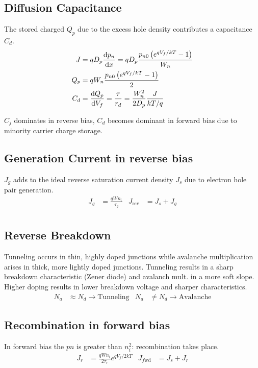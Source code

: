 \documentclass[a4paper, fontsize=8pt, landscape, DIV=1]{scrartcl}
\begin{document}
\begin{multicols*}{4}
    \subsection{Diffusion Capacitance}
    The stored charged $Q_p$ due to the excess hole density contributes a capacitance $C_d$.
    \begin{align*}
      J &= qD_p\frac{\mathrm{d}p_n}{\mathrm{d}x} = qD_p\frac{p_{n0}\left(e^{qV_f/kT}-1\right)}{W_n} \\
      Q_p &= qW_n\frac{p_{n0}\left(e^{qV_f/kT}-1\right)}{2} \\
      C_d &= \frac{\mathrm{d}Q_p}{\mathrm{d}V_f} = \frac{\tau}{r_d} = \frac{W_n^2}{2D_p}\frac{J}{kT/q}
    \end{align*}

    $C_j$ dominates in reverse bias, $C_d$ becomes dominant in forward bias due to minority carrier charge storage.


    \subsection{Generation Current in reverse bias}
    $J_g$ adds to the ideal reverse saturation current density $J_s$ due to electron hole pair generation.
    \begin{align*}
      J_g &= \frac{qWn_i}{\tau_g} & J_{\text{rev}} &= J_s + J_g\\
    \end{align*}

    \subsection{Reverse Breakdown}
    Tunneling occurs in thin, highly doped junctions while avalanche multiplication arises in thick, more lightly doped junctions.
    Tunneling results in a sharp breakdown characteristic (Zener diode) and avalanch mult. in a more soft slope.
    Higher doping results in lower breakdown voltage and sharper characteristics.
    \begin{align*}
      N_a &\approx N_d \to \text{Tunneling} & N_a &\neq N_d \to \text{Avalanche}
    \end{align*}

    \subsection{Recombination in forward bias}
    In forward bias the $pn$ is greater than $n_i^2$: recombination takes place.
    \begin{align*}
      J_r &= \frac{qWn_i}{2\tau_r}e^{qV_f/2kT} & J_{f\text{wd}} &= J_s + J_r\\
    \end{align*}


\end{multicols*}
\end{document}
